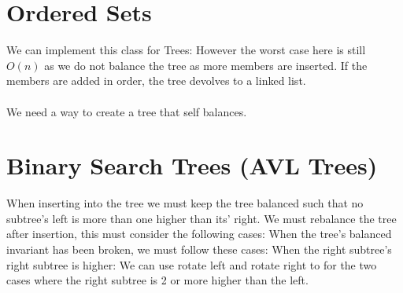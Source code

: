 \documentclass{report}
\begin{document}
\section*{Ordered Sets}
We can implement this class for Trees:
However the worst case here is still $O(n)$ as we do not balance the tree as more members are inserted. If the members are added in order, the tree devolves to a linked list.
\\
\\ We need a way to create a tree that self balances.

\section*{Binary Search Trees (AVL Trees)}
When inserting into the tree we must keep the tree balanced such that no subtree's left is more than one higher than its' right.
We must rebalance the tree after insertion, this must consider the following cases:
When the tree's balanced invariant has been broken, we must follow these cases:
When the right subtree's right subtree is higher:
We can use rotate left and rotate right to for the two cases where the right subtree is 2 or more higher than the left.
\end{document}
